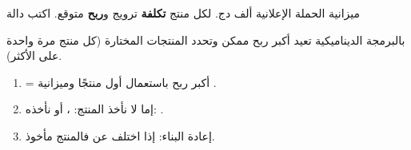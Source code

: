 \begin{statement}
ميزانية الحملة الإعلانية  ألف دج. لكل منتج \textbf{تكلفة} ترويج و\textbf{ربح} متوقع. اكتب دالة \par{\centering\small{}\par} بالبرمجة الديناميكية تعيد أكبر ربح ممكن وتحدد المنتجات المختارة (كل منتج مرة واحدة على الأكثر).
\end{statement}
\begin{stepsbox}\begin{enumerate}
\item {} = أكبر ربح باستعمال أول  منتجًا وميزانية .
\item إما لا نأخذ المنتج: ، أو نأخذه: .
\item إعادة البناء: إذا اختلف  عن  فالمنتج مأخوذ.
\end{enumerate}\end{stepsbox}
